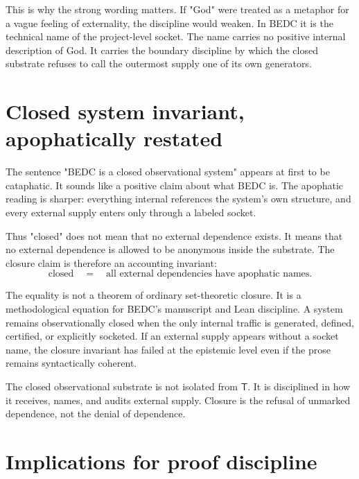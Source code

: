 This is why the strong wording matters. If "God" were treated as a metaphor for a vague feeling of externality, the discipline would weaken. In BEDC it is the technical name of the project-level socket. The name carries no positive internal description of God. It carries the boundary discipline by which the closed substrate refuses to call the outermost supply one of its own generators.

\section{Closed system invariant, apophatically restated}
\label{sec:apophatic-naming-closed-system}

The sentence "BEDC is a closed observational system" appears at first to be cataphatic. It sounds like a positive claim about what BEDC is. The apophatic reading is sharper: everything internal references the system's own structure, and every external supply enters only through a labeled socket.

Thus "closed" does not mean that no external dependence exists. It means that no external dependence is allowed to be anonymous inside the substrate. The closure claim is therefore an accounting invariant:
$$
\text{closed} \quad = \quad \text{all external dependencies have apophatic names}.
$$

The equality is not a theorem of ordinary set-theoretic closure. It is a methodological equation for BEDC's manuscript and Lean discipline. A system remains observationally closed when the only internal traffic is generated, defined, certified, or explicitly socketed. If an external supply appears without a socket name, the closure invariant has failed at the epistemic level even if the prose remains syntactically coherent.

\begin{remark}
\label{rem:apophatic-naming-closure-not-isolation}
The closed observational substrate is not isolated from $\mathsf{T}$. It is disciplined in how it receives, names, and audits external supply. Closure is the refusal of unmarked dependence, not the denial of dependence.
\end{remark}

\section{Implications for proof discipline}
\label{sec:apophatic-naming-proof-discipline}

